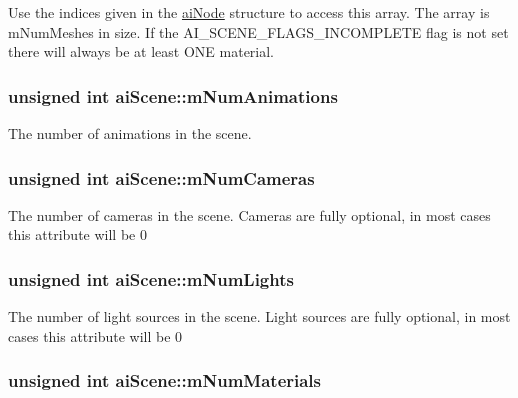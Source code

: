 Use the indices given in the \hyperlink{structai_node}{ai\+Node} structure to access this array. The array is m\+Num\+Meshes in size. If the A\+I\+\_\+\+S\+C\+E\+N\+E\+\_\+\+F\+L\+A\+G\+S\+\_\+\+I\+N\+C\+O\+M\+P\+L\+E\+T\+E flag is not set there will always be at least O\+N\+E material. \hypertarget{structai_scene_aa2af030ec218ead0dc062b6a96a7471a}{
\subsubsection[{m\+Num\+Animations}]{\setlength{\rightskip}{0pt plus 5cm}unsigned int ai\+Scene\+::m\+Num\+Animations}}\label{structai_scene_aa2af030ec218ead0dc062b6a96a7471a}
The number of animations in the scene. \hypertarget{structai_scene_a4abc432e1b22a7e01553f33c79c0592f}{
\subsubsection[{m\+Num\+Cameras}]{\setlength{\rightskip}{0pt plus 5cm}unsigned int ai\+Scene\+::m\+Num\+Cameras}}\label{structai_scene_a4abc432e1b22a7e01553f33c79c0592f}
The number of cameras in the scene. Cameras are fully optional, in most cases this attribute will be 0 \hypertarget{structai_scene_a0c90fc5f15b979e0bb0d3e8f1e246307}{
\subsubsection[{m\+Num\+Lights}]{\setlength{\rightskip}{0pt plus 5cm}unsigned int ai\+Scene\+::m\+Num\+Lights}}\label{structai_scene_a0c90fc5f15b979e0bb0d3e8f1e246307}
The number of light sources in the scene. Light sources are fully optional, in most cases this attribute will be 0 \hypertarget{structai_scene_a4277d8bffe8b8f568098af6c31d042b7}{
\subsubsection[{m\+Num\+Materials}]{\setlength{\rightskip}{0pt plus 5cm}unsigned int ai\+Scene\+::m\+Num\+Materials}}\label{structai_scene_a4277d8bffe8b8f568098af6c31d042b7}
